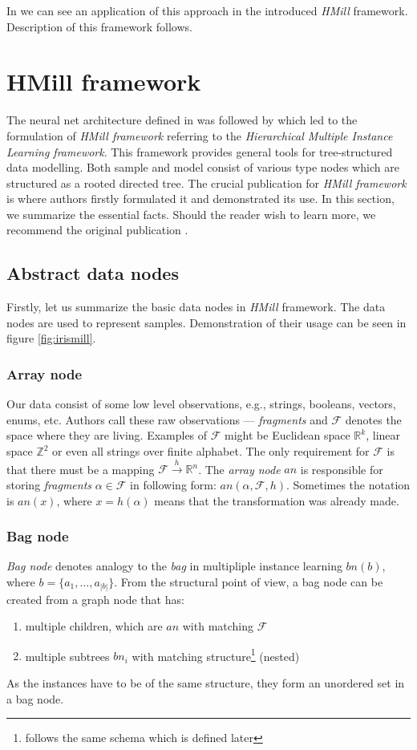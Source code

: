 In \cite{Mandlik2020} we can see an application of this approach in the introduced \emph{HMill} framework. Description of this framework follows.

\section{HMill framework}
The neural net architecture defined in \cite{Pevny2016a} was followed by \cite{Mandlik2020} which led to the formulation of \emph{HMill framework} referring to the \emph{Hierarchical Multiple Instance Learning framework}. This framework provides general tools for tree-structured data modelling. Both sample and model consist of various type nodes which are structured as a rooted directed tree. The crucial publication for \emph{HMill framework} is \cite{Mandlik2020} where authors firstly formulated it and demonstrated its use. In this section, we summarize the essential facts. Should the reader wish to learn more, we recommend the original publication \cite{Mandlik2020}.

\subsection{Abstract data nodes}
Firstly, let us summarize the basic data nodes in \emph{HMill} framework. The data nodes are used to represent samples. Demonstration of their usage can be seen in figure \ref{fig:irismill}.

\subsubsection{Array node}
Our data consist of some low level observations, e.g., strings, booleans, vectors, enums, etc. Authors call these raw observations --- \emph{fragments} and $\mathcal{F}$ denotes the space where they are living. Examples of $\mathcal{F}$ might be Euclidean space $\mathbb{R}^{k}$, linear space $\mathbb{Z}^{2}$ or even all strings over finite alphabet. The only requirement for $\mathcal{F}$ is that there must be a mapping $\mathcal{F}\xrightarrow{h}\mathbb{R}^{n}$. The \emph{array node} $an$ is responsible for storing \emph{fragments} $\alpha\in\mathcal{F}$ in following form: $an(\alpha,\mathcal{F},h)$. Sometimes the notation is $an(x)$, where $x=h(\alpha)$ means that the transformation was already made.

\subsubsection{Bag node}
\emph{Bag node} denotes analogy to the \emph{bag} in multipliple instance learning $bn(b)$, where $b=\{a_1,\dots,a_{|b|}\}$. 
From the structural point of view, a bag node can be created from a graph node that has:
\begin{enumerate}
    \itemsep0em 
    \item multiple children, which are $an$ with matching $\mathcal{F}$
    \item multiple subtrees $bn_i$ with matching structure\footnote{follows the same schema which is defined later} (nested)
\end{enumerate}
As the instances have to be of the same structure, they form an unordered set in a bag node.

